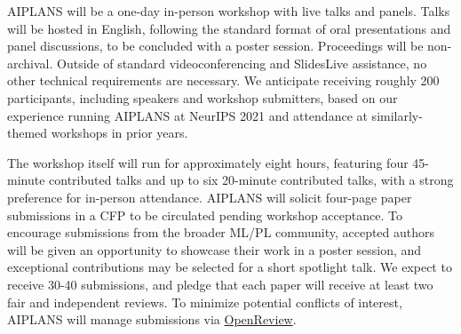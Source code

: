 \documentclass{article}
\begin{document}
    AIPLANS will be a one-day in-person workshop with live talks and panels. Talks will be hosted in English, following the standard format of oral presentations and panel discussions, to be concluded with a poster session. Proceedings will be non-archival. Outside of standard videoconferencing and SlidesLive assistance, no other technical requirements are necessary. We anticipate receiving roughly 200 participants, including speakers and workshop submitters, based on our experience running AIPLANS at NeurIPS 2021 and attendance at similarly-themed workshops in prior years.

%


    The workshop itself will run for approximately eight hours, featuring four 45-minute contributed talks and up to six 20-minute contributed talks, with a strong preference for in-person attendance. AIPLANS will solicit four-page paper submissions in a CFP to be circulated pending workshop acceptance. To encourage submissions from the broader ML/PL community, accepted authors will be given an opportunity to showcase their work in a poster session, and exceptional contributions may be selected for a short spotlight talk. We expect to receive 30-40 submissions, and pledge that each paper will receive at least two fair and independent reviews. To minimize potential conflicts of interest, AIPLANS will manage submissions via \href{https://openreview.net}{OpenReview}.

\end{document}
